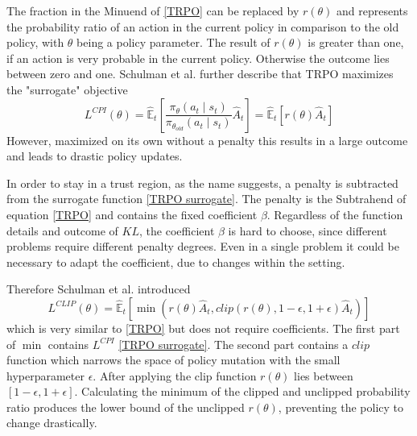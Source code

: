 The fraction in the Minuend of \eqref{TRPO} can be replaced by
$r(\theta)$ %
and represents the probability ratio of an
action in the current policy in comparison to the old policy, with $\theta$ being a policy parameter.
The result of $r(\theta)$ is greater than
one, if an action is very probable in the current policy. Otherwise the outcome lies between zero and one.
Schulman et al. further describe that TRPO maximizes the "surrogate" objective
\begin{equation}\label{TRPO surrogate}
    L^{CPI}(\theta) = \hat{\mathbb{E}}_{t}[ \frac{\pi_{\theta}(a_{t} \mid s_{t})}{\pi_{\theta_{old}}(a_{t} \mid s_{t})} \hat{A}_{t}]
    = \hat{\mathbb{E}}_{t}[r(\theta)\hat{A}_{t}]
\end{equation}
However, maximized on its own without a penalty this results in a large outcome and leads to drastic
policy updates.

In order to stay in a trust region, as the name suggests, a penalty is subtracted from the
surrogate function \eqref{TRPO surrogate}.
The penalty is the Subtrahend of equation \eqref{TRPO} and contains the fixed coefficient $\beta$.
Regardless of the function details and outcome of $KL$, the coefficient $\beta$
is hard to choose, since different problems require different penalty degrees. Even in a single problem
it could be necessary to adapt the coefficient, due to changes within the setting.

Therefore Schulman et al. introduced
\begin{equation}\label{PPO}
    L^{CLIP}(\theta) = \hat{\mathbb{E}}_{t}[\min(r(\theta)\hat{A}_{t},clip(r(\theta), 1-\epsilon, 1+\epsilon)\hat{A}_{t})]
\end{equation}
which is very similar to \eqref{TRPO} but does not require coefficients.
The first part of $\min$ contains $L^{CPI}$ \eqref{TRPO surrogate}.
The second part contains a $clip$ function which narrows the space of policy mutation with
the small hyperparameter $\epsilon$. After applying the clip function $r(\theta)$ lies between
$[1-\epsilon,1+\epsilon]$. Calculating the minimum of the clipped and unclipped probability ratio
produces the lower bound of the unclipped $r(\theta)$, preventing the policy to change drastically.


